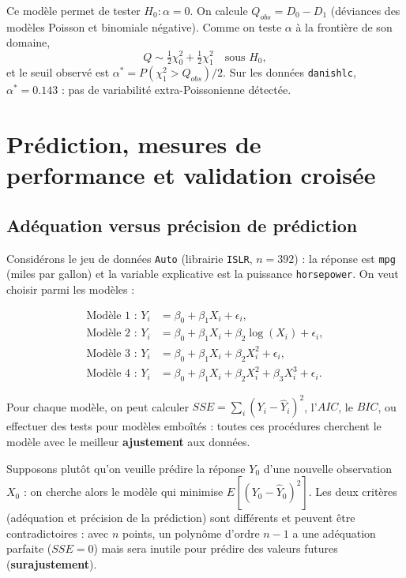 \documentclass[
  french,
  letterpaper,
  DIV=11,
  numbers=noendperiod]{scrreprt}
\begin{document}
Ce modèle permet de tester \(H_0 : \alpha = 0\). On calcule
\(Q_{obs} = D_0 - D_1\) (déviances des modèles Poisson et binomiale
négative). Comme on teste \(\alpha\) à la frontière de son domaine,
\[Q \sim \tfrac{1}{2}\chi^2_0 + \tfrac{1}{2}\chi^2_1 \quad\mbox{sous } H_0,\]
et le seuil observé est \(\alpha^* = P(\chi^2_1 > Q_{obs})/2\). Sur les
données \texttt{danishlc}, \(\alpha^* = 0.143\) : pas de variabilité
extra-Poissonienne détectée.


\chapter{Prédiction, mesures de performance et validation
croisée}\label{sec-cv}

\section{Adéquation versus précision de
prédiction}\label{aduxe9quation-versus-pruxe9cision-de-pruxe9diction}

Considérons le jeu de données \texttt{Auto} (librairie \texttt{ISLR},
\(n = 392\)) : la réponse est \texttt{mpg} (miles par gallon) et la
variable explicative est la puissance \texttt{horsepower}. On veut
choisir parmi les modèles :

\[
\begin{aligned}
\mbox{Modèle 1 : } Y_i &= \beta_0 + \beta_1 X_i + \epsilon_i,\\
\mbox{Modèle 2 : } Y_i &= \beta_0 + \beta_1 X_i + \beta_2\log(X_i) + \epsilon_i,\\
\mbox{Modèle 3 : } Y_i &= \beta_0 + \beta_1 X_i + \beta_2 X_i^2 + \epsilon_i,\\
\mbox{Modèle 4 : } Y_i &= \beta_0 + \beta_1 X_i + \beta_2 X_i^2 + \beta_3 X_i^3 + \epsilon_i.
\end{aligned}
\]

Pour chaque modèle, on peut calculer \(SSE = \sum_i(Y_i - \hat Y_i)^2\),
l'\(AIC\), le \(BIC\), ou effectuer des tests pour modèles emboîtés :
toutes ces procédures cherchent le modèle avec le meilleur
\textbf{ajustement} aux données.

Supposons plutôt qu'on veuille prédire la réponse \(Y_0\) d'une nouvelle
observation \(X_0\) : on cherche alors le modèle qui minimise
\(E[(Y_0 - \hat Y_0)^2]\). Les deux critères (adéquation et précision de
la prédiction) sont différents et peuvent être contradictoires : avec
\(n\) points, un polynôme d'ordre \(n-1\) a une adéquation parfaite
(\(SSE = 0\)) mais sera inutile pour prédire des valeurs futures
(\textbf{surajustement}).
\end{document}
